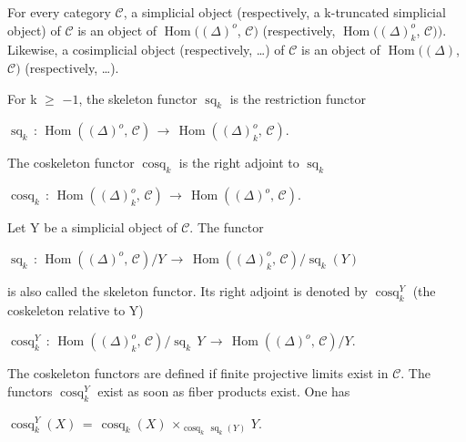 \documentclass[11pt,twoside]{article}
\newcommand{\DFormula}[1]{%
  \par\smallskip\noindent\hspace*{0pt}\(\displaystyle #1\)\par\smallskip
}
\begin{document}
For every category \(\mathcal{C}\), a simplicial object (respectively, a k-truncated simplicial object) of \(\mathcal{C}\) is an object of \(\operatorname{Hom}((\Delta )^{o}\), \(\mathcal{C})\) (respectively, \(\operatorname{Hom}((\Delta )_{k}^{o}\), \(\mathcal{C}))\). Likewise, a cosimplicial object (respectively, …) of \(\mathcal{C}\) is an object of \(\operatorname{Hom}((\Delta )\), \(\mathcal{C})\) (respectively, …).\par
\par\medskip
For k \(\geq \) \(−1\), the skeleton functor \(\operatorname{sq}_{k}\) is the restriction functor\par
\par\medskip
\DFormula{\operatorname{sq}_{k}\,:\,\operatorname{Hom}((\Delta )^{o},\,\mathcal{C})\,\to \,\operatorname{Hom}((\Delta )_{k}^{o},\,\mathcal{C}).}
\par\medskip
The coskeleton functor \(\operatorname{cosq}_{k}\) is the right adjoint to \(\operatorname{sq}_{k}\)\par
\par\medskip
\DFormula{\operatorname{cosq}_{k}\,:\,\operatorname{Hom}((\Delta )_{k}^{o},\,\mathcal{C})\,\to \,\operatorname{Hom}((\Delta )^{o},\,\mathcal{C}).}
\par\medskip
Let Y be a simplicial object of \(\mathcal{C}\). The functor\par
\par\medskip
\DFormula{\operatorname{sq}_{k}\,:\,\operatorname{Hom}((\Delta )^{o},\,\mathcal{C})/Y\,\to \,\operatorname{Hom}((\Delta )_{k}^{o},\,\mathcal{C})/\operatorname{sq}_{k}(Y)}
\par\medskip
is also called the skeleton functor. Its right adjoint is denoted by \(\operatorname{cosq}_{k}^{Y}\) (the coskeleton relative to Y)\par
\par\medskip
\DFormula{\operatorname{cosq}_{k}^{Y}\,:\,\operatorname{Hom}((\Delta )_{k}^{o},\,\mathcal{C})/\operatorname{sq}_{k}\,Y\,\to \,\operatorname{Hom}((\Delta )^{o},\,\mathcal{C})/Y.}
\par\medskip
The coskeleton functors are defined if finite projective limits exist in \(\mathcal{C}\). The functors \(\operatorname{cosq}_{k}^{Y}\) exist as soon as fiber products exist. One has\par
\par\medskip
\DFormula{\operatorname{cosq}_{k}^{Y}(X)\,=\,\operatorname{cosq}_{k}(X)\,\times _{\operatorname{cosq}_{k}\,\operatorname{sq}_{k}(Y)}\,Y.}
\par\medskip
\end{document}
